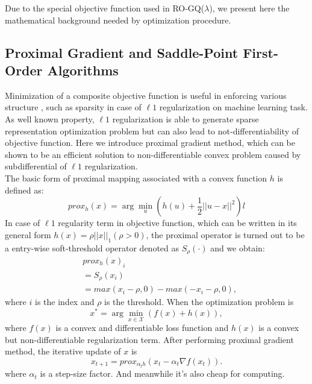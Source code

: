 \documentclass[conference]{IEEEtran}
\begin{document}
Due to the special objective function used in RO-GQ($\lambda$), we present here the mathematical background needed by optimization procedure.
\subsection{Proximal Gradient and Saddle-Point First-Order Algorithms}
Minimization of a composite objective function is useful in enforcing various structure , such as sparsity in case of $\ell1$ regularization on machine learning task. As well known property, $\ell1$ regularization is able to generate sparse representation optimization problem but can also lead to not-differentiability of objective function. Here we introduce proximal gradient method\cite{sra2012optimization}, which can be shown to be an efficient solution to non-differentiable convex problem caused by subdifferential of $\ell1$ regularization.\\
The basic form of proximal mapping associated with a convex function $h$ is defined as:
\begin{equation}
	prox_h(x)=\arg\min_{u}(h(u)+\frac{1}{2}||u-x||^2)l
\end{equation}
In case of $\ell1$ regularity term in objective function, which can be written in its general form $h(x)=\rho||x||_1(\rho > 0)$, the proximal operator is turned out to be a entry-wise soft-threshold operator denoted as $S_\rho(\cdot)$ and we obtain:
\begin{equation}
	\begin{split}
		&prox_h(x)_i\\
		&=S_\rho(x_i)\\
		&=max(x_i-\rho,0)-max(-x_i-\rho, 0),
	\end{split}
\end{equation}
where $i$ is the index and $\rho$ is the threshold. When the optimization problem is 
\begin{equation}
	x^*=\arg\min_{x\in\mathcal{X}}(f(x)+h(x)),
\end{equation}
where $f(x)$ is a convex and differentiable loss function and $h(x)$ is a convex but non-differentiable regularization term. After performing proximal gradient method, the iterative update of $x$ is
\begin{equation}
	x_{t+1}=prox_{\alpha_t h}(x_t-\alpha_t \nabla f(x_t)).
\end{equation}
where $\alpha_t$ is a step-size factor. And meanwhile it's also cheap for computing.
\end{document}
